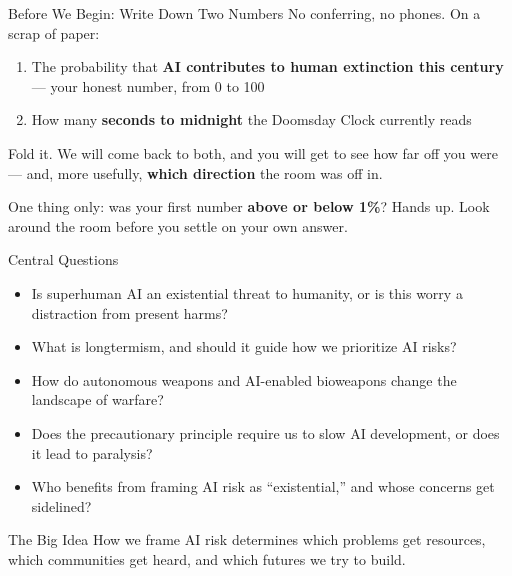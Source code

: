 \documentclass[aspectratio=169,11pt]{beamer}
\begin{document}
\begin{frame}{Before We Begin: Write Down Two Numbers}
No conferring, no phones. On a scrap of paper:

\begin{enumerate}
    \item The probability that \textbf{AI contributes to human extinction this century} --- your honest number, from 0 to 100
    \item How many \textbf{seconds to midnight} the Doomsday Clock currently reads
\end{enumerate}

Fold it. We will come back to both, and you will get to see how far off you were --- and, more usefully, \textbf{which direction} the room was off in.

\begin{discussionbox}
One thing only: was your first number \textbf{above or below 1\%}? Hands up. Look around the room before you settle on your own answer.
\end{discussionbox}
\end{frame}

\begin{frame}{Central Questions}
\begin{itemize}
    \item Is superhuman AI an existential threat to humanity, or is this worry a distraction from present harms?
    \item What is longtermism, and should it guide how we prioritize AI risks?
    \item How do autonomous weapons and AI-enabled bioweapons change the landscape of warfare?
    \item Does the precautionary principle require us to slow AI development, or does it lead to paralysis?
    \item Who benefits from framing AI risk as ``existential,'' and whose concerns get sidelined?
\end{itemize}

\vspace{0.2cm}
\begin{alertblock}{The Big Idea}
How we frame AI risk determines which problems get resources, which communities get heard, and which futures we try to build.
\end{alertblock}
\end{frame}
\end{document}
